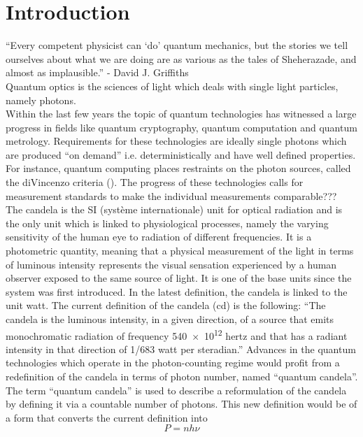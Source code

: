 

\chapter{Introduction}	\label{ch::introduction}

\enquote{Every competent physicist can \enquote{do} quantum mechanics, but the stories we tell ourselves about what we are doing are as various as the tales of Sheherazade, and almost as implausible.} - David J. Griffiths
\\
Quantum optics is the sciences of light which deals with single light particles, namely photons.
\\
Within the last few years the topic of quantum technologies has witnessed a large progress in fields like quantum cryptography, quantum computation and quantum metrology.
Requirements for these technologies are ideally single photons which are produced \enquote{on demand} i.e. deterministically and have well defined properties.
For instance, quantum computing places restraints on the photon sources, called the diVincenzo criteria ().
The progress of these technologies calls for measurement standards to make the individual measurements comparable???
\\
The candela is the SI (syst\`eme internationale) unit for optical radiation \cite{Cheung2007} and is the only unit which is linked to physiological processes, namely the varying sensitivity of the human eye to radiation of different frequencies.
It is a photometric quantity, meaning that a physical measurement of the light in terms of luminous intensity represents the visual sensation experienced by a human observer exposed to the same source of light.
It is one of the base units since the system was first introduced.
In the latest definition, the candela is linked to the unit watt.
The current definition of the candela (cd) is the following:
\enquote{The candela is the luminous intensity, in a given direction, of a source that emits monochromatic radiation of frequency \num{540e12} hertz and that has a radiant intensity in that direction of 1/683 watt per steradian.}\cite{NistSIunits}
Advances in the quantum technologies which operate in the photon-counting regime would profit from a redefinition of the candela in terms of photon number, named \enquote{quantum candela}.
\\
The term \enquote{quantum candela} is used to describe a reformulation of the candela by defining it via a countable number of photons.
This new definition would be of a form that converts the current definition into
\begin{equation}
	P=nh\nu
\end{equation}

